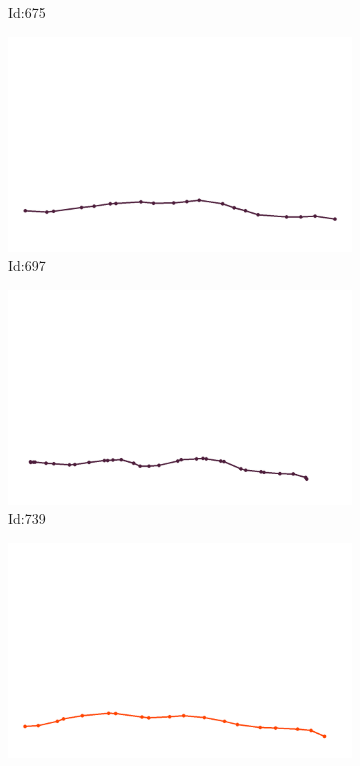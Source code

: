 \documentclass[12pt,twoside]{report}
\begin{document}
\begin{figure}
\begin{subfigure}[b]{0.20\textwidth}
\caption{Id:675}
\end{subfigure}
\begin{subfigure}[b]{0.20\textwidth}
\centering
\includegraphics[width=\textwidth]{../trajectories/697.png}
\caption{Id:697}
\end{subfigure}
\begin{subfigure}[b]{0.20\textwidth}
\centering
\includegraphics[width=\textwidth]{../trajectories/739.png}
\caption{Id:739}
\end{subfigure}
\begin{subfigure}[b]{0.20\textwidth}
\centering
\includegraphics[width=\textwidth]{../trajectories/765.png}

\end{subfigure}
\end{figure}
\end{document}
